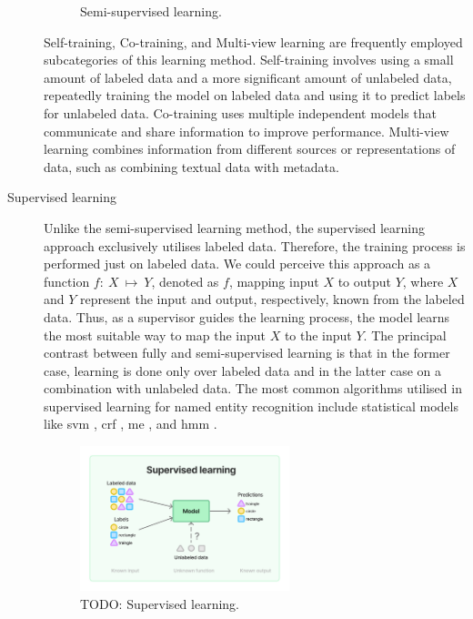 \begin{description}
\begin{figure}[H]
        \caption{Semi-supervised learning.}
        \label{fig:semi-supervised-learning}
    \end{figure}
    Self-training, Co-training, and Multi-view learning are frequently employed subcategories of this learning method. Self-training involves using a small amount of labeled data and a more significant amount of unlabeled data, repeatedly training the model on labeled data and using it to predict labels for unlabeled data. Co-training uses multiple independent models that communicate and share information to improve performance. Multi-view learning combines information from different sources or representations of data, such as combining textual data with metadata.
    \item[Supervised learning] Unlike the semi-supervised learning method, the supervised learning approach exclusively utilises labeled data. Therefore, the training process is performed just on labeled data. We could perceive this approach as a function $f:~X~\mapsto~Y$, denoted as $f$, mapping input $X$ to output $Y$, where $X$ and $Y$ represent the input and output, respectively, known from the labeled data. Thus, as a supervisor guides the learning process, the model learns the most suitable way to map the input $X$ to the input $Y$. The principal contrast between fully and semi-supervised learning is that in the former case, learning is done only over labeled data and in the latter case on a combination with unlabeled data. The most common algorithms utilised in supervised learning for named entity recognition include statistical models like \acrfull{svm} \parencite{wang2005svm}, \acrfull{crf} \parencite{sutton2012crf}, \acrfull{me} \parencite{berger1996me}, and \acrfull{hmm} \parencite{EDDY1996361hmm}.
    \begin{figure}[H]
        \centering
        \includegraphics[width=0.6\textwidth]{img/supervised.pdf}
        \caption{TODO: Supervised learning.}
        \label{fig:supervised-learning}
    \end{figure}
\end{description}

